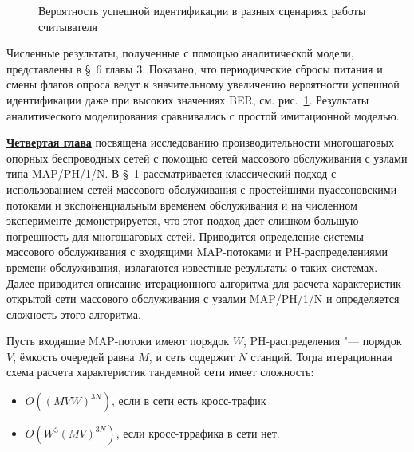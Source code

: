 \begin{figure}[ht!]
  \caption{Вероятность успешной идентификации в разных сценариях работы считывателя}\label{fig:id_prob_var_scenario}
\end{figure}

Численные результаты, полученные с помощью аналитической модели, представлены в \S~6 главы 3. Показано, что периодические сбросы питания и смены флагов опроса ведут к значительному увеличению вероятности успешной идентификации даже при высоких значениях BER, см. рис.~\ref{fig:id_prob_var_scenario}. Результаты аналитического моделирования сравнивались с простой имитационной моделью.



\underline{\textbf{Четвертая глава}} посвящена исследованию производительности многошаговых опорных беспроводных сетей с помощью сетей массового обслуживания с узлами типа MAP/PH/1/N. В \S~1 рассматривается классический подход с использованием сетей массового обслуживания с простейшими пуассоновскими потоками и экспоненциальным временем обслуживания и на численном эксперименте демонстрируется, что этот подход дает слишком большую погрешность для многошаговых сетей. Приводится определение системы массового обслуживания с входящими MAP-потоками и PH-распределениями времени обслуживания, излагаются известные результаты о таких системах. Далее приводится описание итерационного алгоритма для расчета характеристик открытой сети массового обслуживания с узалми MAP/PH/1/N и определяется сложность этого алгоритма.


\begin{prop}
  Пусть входящие MAP-потоки имеют порядок $W$, PH-распределения "--- порядок $V$, ёмкость очередей равна $M$, и сеть содержит $N$ станций. Тогда итерационная схема расчета характеристик тандемной сети имеет сложность:
  \begin{itemize}
    \item $O((M V W)^{3N})$, если в сети есть кросс-трафик
    \item $O(W^3 (M V)^{3N})$, если кросс-тррафика в сети нет.
  \end{itemize}
\end{prop}

